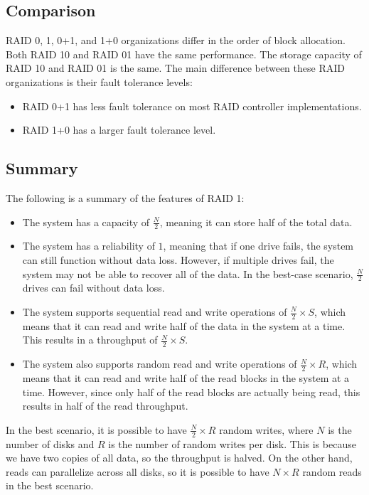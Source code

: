 \subsection{Comparison}
RAID 0, 1, 0+1, and 1+0 organizations differ in the order of block allocation.
Both RAID 10 and RAID 01 have the same performance. 
The storage capacity of RAID 10 and RAID 01 is the same.
The main difference between these RAID organizations is their fault tolerance levels:
\begin{itemize}
    \item RAID 0+1 has less fault tolerance on most RAID controller implementations.
    \item RAID 1+0 has a larger fault tolerance level.
\end{itemize}

\subsection{Summary}
The following is a summary of the features of RAID 1:
\begin{itemize}
    \item The system has a capacity of $\frac{N}{2}$, meaning it can store half of the total data.
    \item The system has a reliability of $1$, meaning that if one drive fails, the system can still function without data loss.
        However, if multiple drives fail, the system may not be able to recover all of the data. 
        In the best-case scenario, $\frac{N}{2}$ drives can fail without data loss.
    \item The system supports sequential read and write operations of $\frac{N}{2}\times S$, which means that it can read and write half of the data in the system at a time.
        This results in a throughput of $\frac{N}{2}\times S$.
    \item The system also supports random read and write operations of $\frac{N}{2}\times R$, which means that it can read and write half of the read blocks in the system at a time. 
        However, since only half of the read blocks are actually being read, this results in half of the read throughput.
\end{itemize}
In the best scenario, it is possible to have $\frac{N}{2} \times R$ random writes, where $N$ is the number of disks and $R$ is the number of random writes per disk. 
This is because we have two copies of all data, so the throughput is halved. 
On the other hand, reads can parallelize across all disks, so it is possible to have $N \times R$ random reads in the best scenario.

